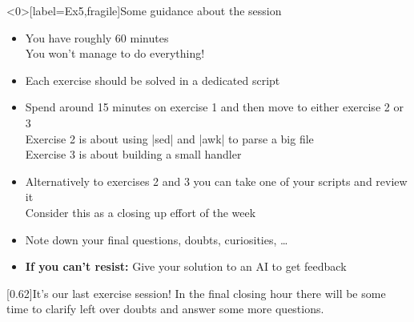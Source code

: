 
\begin{frame}<0>[label=Ex5,fragile]{Some guidance about the session}
    \vspace{-2mm}
    \begin{itemize}
        \item You have roughly 60 minutes\\
              \then You won't manage to do everything! 
        \item Each exercise should be solved in a dedicated script
        \item Spend around 15 minutes on exercise 1 and then move to either exercise 2 or 3\\
              \then Exercise 2 is about using \bash|sed| and \bash|awk| to parse a big file\\
              \then Exercise 3 is about building a small handler
        \item Alternatively to exercises 2 and 3 you can take one of your scripts and review it\\
              \then Consider this as a closing up effort of the week
        \item Note down your final questions, doubts, curiosities, \ldots
        \item \alert{\textbf{If you can't resist:} Give your solution to an AI to get feedback} 
    \end{itemize}
    \begin{varblock}{}[0.62\textwidth]{It's our last exercise session!}
        In the final closing hour there will be some time to clarify left over doubts and answer some more questions.
    \end{varblock}
\end{frame}
